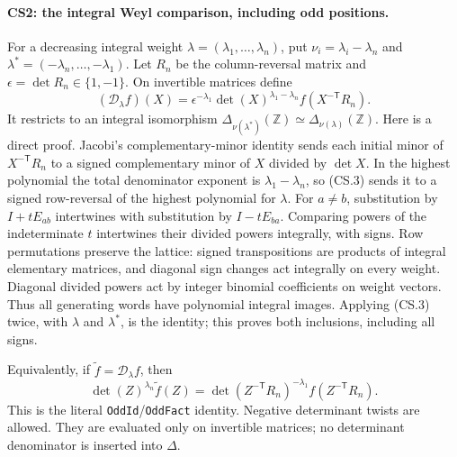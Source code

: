\paragraph{CS2: the integral Weyl comparison, including odd positions.}
For a decreasing integral weight $\lambda=(\lambda_1,\ldots,\lambda_n)$,
put $\nu_i=\lambda_i-\lambda_n$ and
$\lambda^*=(-\lambda_n,\ldots,-\lambda_1)$. Let $R_n$ be the
column-reversal matrix and $\epsilon=\det R_n\in\{1,-1\}$.
On invertible matrices define
\[
 (\mathcal D_\lambda f)(X)=
 \epsilon^{-\lambda_1}\det(X)^{\lambda_1-\lambda_n}
                      f(X^{-\mathsf T}R_n).             \tag{CS.3}
\]
It restricts to an integral isomorphism
$\Delta_{\nu(\lambda^*)}(\mathbb Z)\simeq
\Delta_{\nu(\lambda)}(\mathbb Z)$.
Here is a direct proof. Jacobi's complementary-minor identity sends
each initial minor of $X^{-\mathsf T}R_n$ to a signed complementary
minor of $X$ divided by $\det X$. In the highest polynomial the total
denominator exponent is $\lambda_1-\lambda_n$, so (CS.3) sends it
to a signed row-reversal of the highest polynomial for $\lambda$.
For $a\ne b$, substitution by $I+tE_{ab}$ intertwines with substitution
by $I-tE_{ba}$. Comparing powers of the indeterminate $t$ intertwines
their divided powers integrally, with signs. Row permutations preserve
the lattice: signed transpositions are products of integral elementary
matrices, and diagonal sign changes act integrally on every weight.
Diagonal divided powers act by integer binomial coefficients on weight
vectors. Thus all generating words have polynomial integral images.
Applying (CS.3) twice, with $\lambda$ and $\lambda^*$, is the identity;
this proves both inclusions, including all signs.

Equivalently, if $\widetilde f=\mathcal D_\lambda f$, then
\[
 \det(Z)^{\lambda_n}\widetilde f(Z)=
 \det(Z^{-\mathsf T}R_n)^{-\lambda_1}
                                    f(Z^{-\mathsf T}R_n).       \tag{CS.4}
\]
This is the literal \texttt{OddId}/\texttt{OddFact} identity. Negative
determinant twists are allowed. They are evaluated only on invertible
matrices; no determinant denominator is inserted into $\Delta$.

